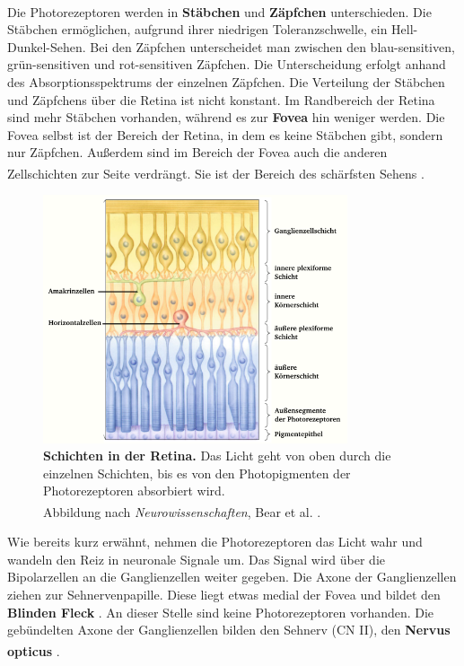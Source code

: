 \documentclass[12pt,a4paper,pdftex]{article}
\begin{document}
\\
\noindent Die Photorezeptoren werden in \textbf{Stäbchen}  und \textbf{Zäpfchen}  unterschieden. Die Stäbchen ermöglichen, aufgrund ihrer niedrigen Toleranzschwelle, ein Hell-Dunkel-Sehen. Bei den Zäpfchen unterscheidet man zwischen den blau-sensitiven, grün-sensitiven und rot-sensitiven Zäpfchen. Die Unterscheidung erfolgt anhand des Absorptionsspektrums der einzelnen Zäpfchen. Die Verteilung der Stäbchen und Zäpfchens über die Retina ist nicht konstant. Im Randbereich der Retina sind mehr Stäbchen vorhanden, während es zur \textbf{Fovea}  hin weniger werden. Die Fovea selbst ist der Bereich der Retina, in dem es keine Stäbchen gibt, sondern nur Zäpfchen. Außerdem sind im Bereich der Fovea auch die anderen Zellschichten zur Seite verdrängt. Sie ist der Bereich des schärfsten Sehens \textsuperscript{\cite[10]{neurowissenschaften_baer}}.
\begin{figure}[H]
    \centering
    \includegraphics[width = 0.8\textwidth]{pictures/visual/retina.png}
    \caption[Schichten in der Retina]{\textbf{Schichten in der Retina.} Das Licht geht von oben durch die einzelnen Schichten, bis es von den Photopigmenten der Photorezeptoren absorbiert wird. \\
    Abbildung nach \textit{Neurowissenschaften}, Bear et al. \textsuperscript{\cite[10]{neurowissenschaften_baer}}.}
    \label{fig:retina}
\end{figure}

Wie bereits kurz erwähnt, nehmen die Photorezeptoren das Licht wahr und wandeln den Reiz in neuronale Signale um. Das Signal wird über die Bipolarzellen an die Ganglienzellen weiter gegeben. Die Axone der Ganglienzellen ziehen zur Sehnervenpapille. Diese liegt etwas medial der Fovea und bildet den \textbf{Blinden Fleck} . An dieser Stelle sind keine Photorezeptoren vorhanden. Die gebündelten Axone der Ganglienzellen bilden den Sehnerv (CN II), den \textbf{Nervus opticus} \textsuperscript{\cite[15]{crossman2014neuroanatomy}}.  
\end{document}
